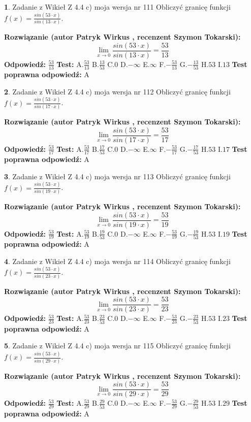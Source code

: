 \documentclass[12pt, a4paper]{article}
\theoremstyle{definition} %
\newtheorem{zad}{}
\newcommand{\zadStart}[1]{\begin{zad}#1\newline}
\newcommand{\zadStop}{\end{zad}}
\newcommand{\rozwStart}[2]{\noindent \textbf{Rozwiązanie (autor #1 , recenzent #2): }\newline}
\newcommand{\rozwStop}{\newline}
\newcommand{\odpStart}{\noindent \textbf{Odpowiedź:}\newline}
\newcommand{\odpStop}{\newline}
\newcommand{\testStart}{\noindent \textbf{Test:}\newline}
\newcommand{\testStop}{\newline}
\newcommand{\kluczStart}{\noindent \textbf{Test poprawna odpowiedź:}\newline}
\newcommand{\kluczStop}{\newline}
\begin{document}
\zadStart{Zadanie z Wikieł Z 4.4 c) moja wersja nr 111}
Obliczyć granicę funkcji $f(x)=\frac{sin(53\cdot x)}{sin(13\cdot x)}$.
\zadStop
\rozwStart{Patryk Wirkus}{Szymon Tokarski}
$$\lim\limits_{x\to 0}\frac{sin(53\cdot x)}{sin(13\cdot x)}=
\frac{53}{13}$$
\rozwStop
\odpStart
$\frac{53}{13}$
\odpStop
\testStart
A.$\frac{53}{13}$
B.$\frac{13}{53}$
C.$0$
D.$-\infty$
E.$\infty$
F.$-\frac{53}{13}$
G.$-\frac{13}{53}$
H.$53$
I.$13$
\testStop
\kluczStart
A
\kluczStop



\zadStart{Zadanie z Wikieł Z 4.4 c) moja wersja nr 112}
Obliczyć granicę funkcji $f(x)=\frac{sin(53\cdot x)}{sin(17\cdot x)}$.
\zadStop
\rozwStart{Patryk Wirkus}{Szymon Tokarski}
$$\lim\limits_{x\to 0}\frac{sin(53\cdot x)}{sin(17\cdot x)}=
\frac{53}{17}$$
\rozwStop
\odpStart
$\frac{53}{17}$
\odpStop
\testStart
A.$\frac{53}{17}$
B.$\frac{17}{53}$
C.$0$
D.$-\infty$
E.$\infty$
F.$-\frac{53}{17}$
G.$-\frac{17}{53}$
H.$53$
I.$17$
\testStop
\kluczStart
A
\kluczStop



\zadStart{Zadanie z Wikieł Z 4.4 c) moja wersja nr 113}
Obliczyć granicę funkcji $f(x)=\frac{sin(53\cdot x)}{sin(19\cdot x)}$.
\zadStop
\rozwStart{Patryk Wirkus}{Szymon Tokarski}
$$\lim\limits_{x\to 0}\frac{sin(53\cdot x)}{sin(19\cdot x)}=
\frac{53}{19}$$
\rozwStop
\odpStart
$\frac{53}{19}$
\odpStop
\testStart
A.$\frac{53}{19}$
B.$\frac{19}{53}$
C.$0$
D.$-\infty$
E.$\infty$
F.$-\frac{53}{19}$
G.$-\frac{19}{53}$
H.$53$
I.$19$
\testStop
\kluczStart
A
\kluczStop



\zadStart{Zadanie z Wikieł Z 4.4 c) moja wersja nr 114}
Obliczyć granicę funkcji $f(x)=\frac{sin(53\cdot x)}{sin(23\cdot x)}$.
\zadStop
\rozwStart{Patryk Wirkus}{Szymon Tokarski}
$$\lim\limits_{x\to 0}\frac{sin(53\cdot x)}{sin(23\cdot x)}=
\frac{53}{23}$$
\rozwStop
\odpStart
$\frac{53}{23}$
\odpStop
\testStart
A.$\frac{53}{23}$
B.$\frac{23}{53}$
C.$0$
D.$-\infty$
E.$\infty$
F.$-\frac{53}{23}$
G.$-\frac{23}{53}$
H.$53$
I.$23$
\testStop
\kluczStart
A
\kluczStop



\zadStart{Zadanie z Wikieł Z 4.4 c) moja wersja nr 115}
Obliczyć granicę funkcji $f(x)=\frac{sin(53\cdot x)}{sin(29\cdot x)}$.
\zadStop
\rozwStart{Patryk Wirkus}{Szymon Tokarski}
$$\lim\limits_{x\to 0}\frac{sin(53\cdot x)}{sin(29\cdot x)}=
\frac{53}{29}$$
\rozwStop
\odpStart
$\frac{53}{29}$
\odpStop
\testStart
A.$\frac{53}{29}$
B.$\frac{29}{53}$
C.$0$
D.$-\infty$
E.$\infty$
F.$-\frac{53}{29}$
G.$-\frac{29}{53}$
H.$53$
I.$29$
\testStop
\kluczStart
A
\kluczStop
\end{document}
